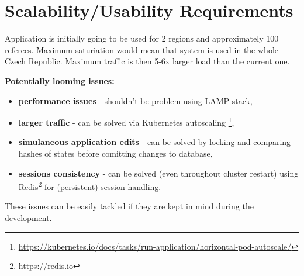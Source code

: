 \section{Scalability/Usability Requirements}
Application is initially going to be used for 2 regions and approximately 100 referees. Maximum saturiation would mean that system is used in the whole Czech Republic. Maximum traffic is then 5-6x larger load than the current one.
\newline
\par
\textbf{Potentially looming issues:}
\begin{itemize}
  \item \textbf{performance issues} - shouldn't be problem using LAMP stack, 
  \item \textbf{larger traffic} - can be solved via Kubernetes autoscaling \footnote{\url{https://kubernetes.io/docs/tasks/run-application/horizontal-pod-autoscale/}},  
  \item \textbf{simulaneous application edits} - can be solved by locking and comparing hashes of states before comitting changes to database,
  \item \textbf{sessions consistency} - can be solved (even throughout cluster restart) using Redis\footnote{\url{https://redis.io}} for (persistent) session handling.
\end{itemize}
These issues can be easily tackled if they are kept in mind during the development.